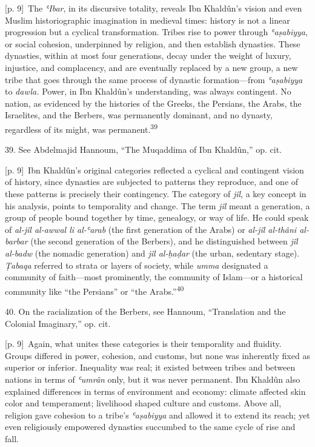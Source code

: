 \documentclass[10pt,a4paper]{article}
\begin{document}
{\scriptsize\color{gray} [p. 9]}\ The \textit{ʿIbar}, in its discursive totality, reveals Ibn Khaldûn’s vision and even Muslim historiographic imagination in medieval times: history is not a linear progression but a cyclical transformation. Tribes rise to power through \textit{ʿaṣabiyya}, or social cohesion, underpinned by religion, and then establish dynasties. These dynasties, within at most four generations, decay under the weight of luxury, injustice, and complacency, and are eventually replaced by a new group, a new tribe that goes through the same process of dynastic formation—from \textit{ʿaṣabiyya} to \textit{dawla.} Power, in Ibn Khaldûn’s understanding, was always contingent. No nation, as evidenced by the histories of the Greeks, the Persians, the Arabs, the Israelites, and the Berbers, was permanently dominant, and no dynasty, regardless of its might, was permanent.\nobreak\textsuperscript{39}\par{\small 39. See Abdelmajid Hannoum, “The Muqaddima of Ibn Khaldûn,” op. cit.\par}
{\scriptsize\color{gray} [p. 9]}\ Ibn Khaldûn’s original categories reflected a cyclical and contingent vision of history, since dynasties are subjected to patterns they reproduce, and one of these patterns is precisely their contingency. The category of \textit{jîl}, a key concept in his analysis, points to temporality and change. The term \textit{jîl} meant a generation, a group of people bound together by time, genealogy, or way of life. He could speak of \textit{al-jîl al-awwal li al-ʿarab} (the first generation of the Arabs) or \textit{al-jîl al-thâni al-barbar} (the second generation of the Berbers), and he distinguished between \textit{jîl al-badw} (the nomadic generation) and \textit{jîl al-ḥaḍar} (the urban, sedentary stage). \textit{Ṭabaqa} referred to strata or layers of society, while \textit{umma} designated a community of faith—most prominently, the community of Islam—or a historical community like “the Persians” or “the Arabs.”\nobreak\textsuperscript{40}\par{\small 40. On the racialization of the Berbers, see Hannoum, “Translation and the Colonial Imaginary,” op. cit.\par}
{\scriptsize\color{gray} [p. 9]}\ Again, what unites these categories is their temporality and fluidity. Groups differed in power, cohesion, and customs, but none was inherently fixed as superior or inferior. Inequality was real; it existed between tribes and between nations in terms of \textit{ʿumrân} only, but it was never permanent. Ibn Khaldûn also explained differences in terms of environment and economy: climate affected skin color and temperament; livelihood shaped culture and customs. Above all, religion gave cohesion to a tribe’s \textit{ʿaṣabiyya} and allowed it to extend its reach; yet even religiously empowered dynasties succumbed to the same cycle of rise and fall.\par
\end{document}
